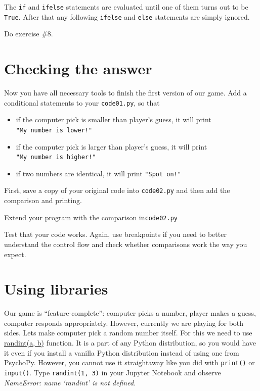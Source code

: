 \documentclass[
]{book}
\providecommand{\tightlist}{%
  \setlength{\itemsep}{0pt}\setlength{\parskip}{0pt}}
\begin{document}
The \texttt{if} and \texttt{ifelse} statements are evaluated until one of them turns out to be \texttt{True}. After that any following \texttt{ifelse} and \texttt{else} statements are simply ignored.

Do exercise \#8.

\hypertarget{checking-the-answer}{%
\section{Checking the answer}\label{checking-the-answer}}

Now you have all necessary tools to finish the first version of our game. Add a conditional statements to your \texttt{code01.py}, so that

\begin{itemize}
\tightlist
\item
  if the computer pick is smaller than player's guess, it will print \texttt{"My\ number\ is\ lower!"}
\item
  if the computer pick is larger than player's guess, it will print \texttt{"My\ number\ is\ higher!"}
\item
  if two numbers are identical, it will print \texttt{"Spot\ on!"}
\end{itemize}

First, save a copy of your original code into \texttt{code02.py} and then add the comparison and printing.

Extend your program with the comparison in\texttt{code02.py}

Test that your code works. Again, use breakpoints if you need to better understand the control flow and check whether comparisons work the way you expect.

\hypertarget{using-libraries}{%
\section{Using libraries}\label{using-libraries}}

Our game is ``feature-complete'': computer picks a number, player makes a guess, computer responds appropriately. However, currently we are playing for both sides. Lets make computer pick a random number itself. For this we need to use \href{https://docs.python.org/3/library/random.html\#random.randint}{randint(a, b)} function. It is a part of any Python distribution, so you would have it even if you install a vanilla Python distribution instead of using one from PsychoPy. However, you cannot use it straightaway like you did with \texttt{print()} or \texttt{input()}. Type \texttt{randint(1,\ 3)} in your Jupyter Notebook and observe \emph{NameError: name `randint' is not defined}.
\end{document}
